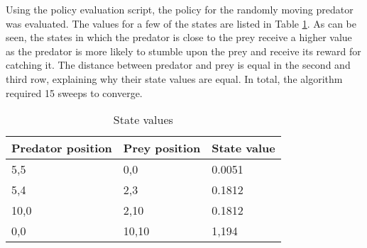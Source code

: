 Using the policy evaluation script, the policy for the randomly moving predator was evaluated. The values for a few of the states are listed in Table \ref{tab-poleval}. As can be seen, the states in which the predator is close to the prey receive a higher value as the predator is more likely to stumble upon the prey and receive its reward for catching it. The distance between predator and prey is equal in the second and third row, explaining why their state values are equal. In total, the algorithm required 15 sweeps to converge. \\

\begin{table}
\begin{center}
  \begin{tabular}{l | l | l}
     Predator position & Prey position & State value \\
    \hline
    5,5 & 0,0 & 0.0051 \\
    5,4 & 2,3 & 0.1812 \\
    10,0 & 2,10 & 0.1812 \\
    0,0 & 10,10 & 1,194
  \end{tabular}
  \caption{State values}
  \label{tab-poleval}
\end{center}
\end{table}

